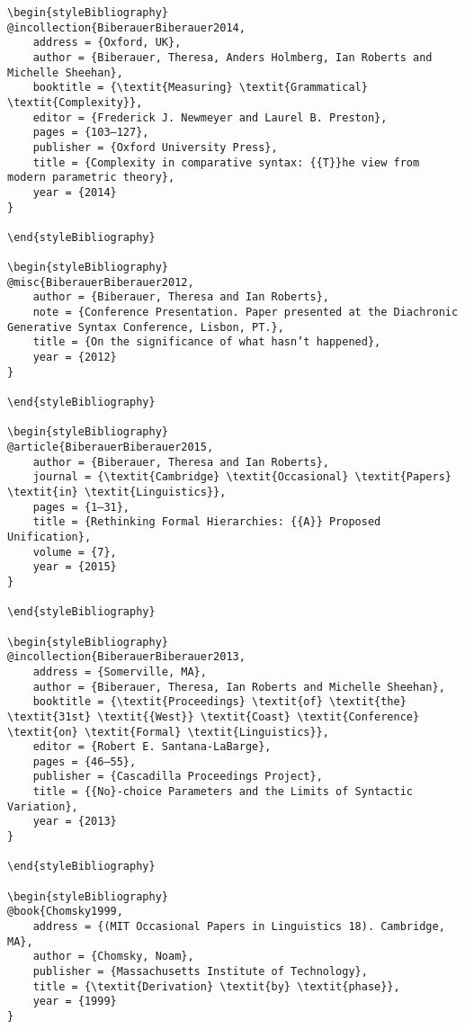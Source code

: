 \documentclass[output=paper]{langscibook}
\begin{document}
\begin{verbatim}
\begin{styleBibliography}
@incollection{BiberauerBiberauer2014,
	address = {Oxford, UK},
	author = {Biberauer, Theresa, Anders Holmberg, Ian Roberts and Michelle Sheehan},
	booktitle = {\textit{Measuring} \textit{Grammatical} \textit{Complexity}},
	editor = {Frederick J. Newmeyer and Laurel B. Preston},
	pages = {103–127},
	publisher = {Oxford University Press},
	title = {Complexity in comparative syntax: {{T}}he view from modern parametric theory},
	year = {2014}
}

\end{styleBibliography}

\begin{styleBibliography}
@misc{BiberauerBiberauer2012,
	author = {Biberauer, Theresa and Ian Roberts},
	note = {Conference Presentation. Paper presented at the Diachronic Generative Syntax Conference, Lisbon, PT.},
	title = {On the significance of what hasn’t happened},
	year = {2012}
}

\end{styleBibliography}

\begin{styleBibliography}
@article{BiberauerBiberauer2015,
	author = {Biberauer, Theresa and Ian Roberts},
	journal = {\textit{Cambridge} \textit{Occasional} \textit{Papers} \textit{in} \textit{Linguistics}},
	pages = {1–31},
	title = {Rethinking Formal Hierarchies: {{A}} Proposed Unification},
	volume = {7},
	year = {2015}
}

\end{styleBibliography}

\begin{styleBibliography}
@incollection{BiberauerBiberauer2013,
	address = {Somerville, MA},
	author = {Biberauer, Theresa, Ian Roberts and Michelle Sheehan},
	booktitle = {\textit{Proceedings} \textit{of} \textit{the} \textit{31st} \textit{{West}} \textit{Coast} \textit{Conference} \textit{on} \textit{Formal} \textit{Linguistics}},
	editor = {Robert E. Santana-LaBarge},
	pages = {46–55},
	publisher = {Cascadilla Proceedings Project},
	title = {{No}-choice Parameters and the Limits of Syntactic Variation},
	year = {2013}
}

\end{styleBibliography}

\begin{styleBibliography}
@book{Chomsky1999,
	address = {(MIT Occasional Papers in Linguistics 18). Cambridge, MA},
	author = {Chomsky, Noam},
	publisher = {Massachusetts Institute of Technology},
	title = {\textit{Derivation} \textit{by} \textit{phase}},
	year = {1999}
}


\end{verbatim}
\end{document}
